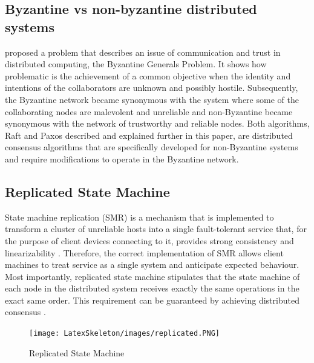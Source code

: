 \documentclass[oneside,12pt]{book}
\begin{document}
\subsection{Byzantine vs non-byzantine distributed systems}
\par {}\cite{10.1145/357172.357176} proposed a problem that describes an issue of communication and trust in distributed computing, the Byzantine Generals Problem. It shows how problematic is the achievement of a common objective when the identity and intentions of the collaborators are unknown and possibly hostile.  Subsequently, the Byzantine network became synonymous with the system where some of the collaborating nodes are malevolent and unreliable and non-Byzantine became synonymous with the network of trustworthy and reliable nodes.\smallskip \newline 
Both algorithms, Raft and Paxos described and explained further in this paper, are distributed consensus algorithms that are specifically developed for non-Byzantine systems and require modifications to operate in the Byzantine network.
\subsection{Replicated State Machine}
\par State machine replication (SMR) is a mechanism that is implemented to transform a cluster of unreliable hosts into a single fault-tolerant service that, for the purpose of client devices connecting to it, provides strong consistency and linearizability \citep{StateMachine}. Therefore, the correct implementation of SMR allows client machines to treat service as a single system and anticipate expected behaviour. Most importantly, replicated state machine stipulates that the state machine of each node in the distributed system receives exactly the same operations in the exact same order. This requirement can be guaranteed by achieving distributed consensus \citep{194954}.

\begin{figure}[H]
\centering
\texttt{[image: LatexSkeleton/images/replicated.PNG]}
\caption{Replicated State Machine }\citep{StateMachine}
\end{figure}
\end{document}
